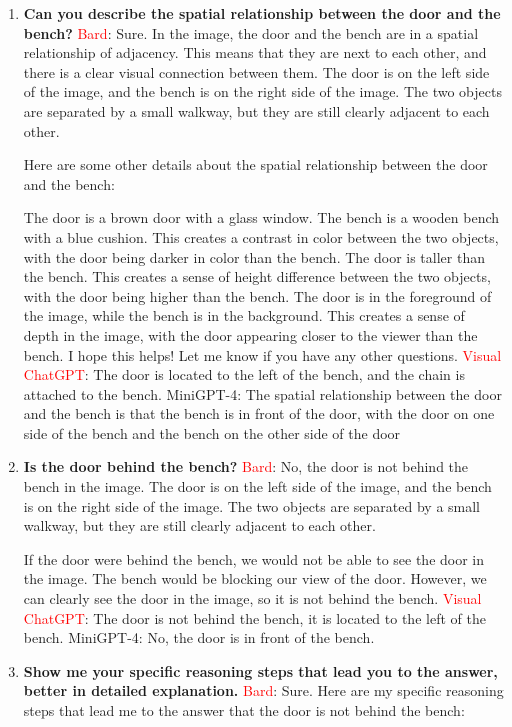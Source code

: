     \begin{enumerate}
        \item \textbf{Can you describe the spatial relationship between the door and the bench?}
        \subitem \textcolor{Red}{Bard}: Sure. In the image, the door and the bench are in a spatial relationship of adjacency. This means that they are next to each other, and there is a clear visual connection between them. The door is on the left side of the image, and the bench is on the right side of the image. The two objects are separated by a small walkway, but they are still clearly adjacent to each other.

        Here are some other details about the spatial relationship between the door and the bench:
        
        The door is a brown door with a glass window. The bench is a wooden bench with a blue cushion. This creates a contrast in color between the two objects, with the door being darker in color than the bench.
        The door is taller than the bench. This creates a sense of height difference between the two objects, with the door being higher than the bench.
        The door is in the foreground of the image, while the bench is in the background. This creates a sense of depth in the image, with the door appearing closer to the viewer than the bench.
        I hope this helps! Let me know if you have any other questions.
        \subitem \textcolor{red}{Visual ChatGPT}: The door is located to the left of the bench, and the chain is attached to the bench.
        \subitem MiniGPT-4: The spatial relationship between the door and the bench is that the bench is in front of the door, with the door on one side of the bench and the bench on the other side of the door
        \item \textbf{Is the door behind the bench?}
        \subitem \textcolor{Red}{Bard}: No, the door is not behind the bench in the image. The door is on the left side of the image, and the bench is on the right side of the image. The two objects are separated by a small walkway, but they are still clearly adjacent to each other.

        If the door were behind the bench, we would not be able to see the door in the image. The bench would be blocking our view of the door. However, we can clearly see the door in the image, so it is not behind the bench.
        \subitem \textcolor{red}{Visual ChatGPT}: The door is not behind the bench, it is located to the left of the bench.
        \subitem MiniGPT-4: No, the door is in front of the bench.
        \item \textbf{Show me your specific reasoning steps that lead you to the answer, better in detailed explanation.}
        \subitem \textcolor{Red}{Bard}: Sure. Here are my specific reasoning steps that lead me to the answer that the door is not behind the bench:


\end{enumerate}
